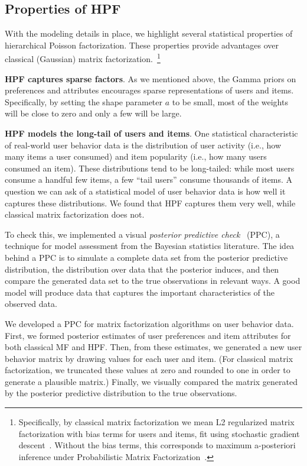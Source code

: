 \subsection{Properties of HPF}

With the modeling details in place, we highlight several statistical
properties of hierarchical Poisson factorization.  These properties
provide advantages over classical (Gaussian) matrix
factorization.~\footnote{Specifically, by classical matrix
  factorization we mean L2 regularized matrix factorization with
  bias terms for users and items, fit using stochastic gradient
  descent~\cite{Koren:2009}. Without the bias terms, this corresponds
  to maximum a-posteriori inference under Probabilistic Matrix
  Factorization~\cite{Salakhutdinov:2008a}.}

{\bf HPF captures sparse factors}.  As we mentioned above, the Gamma
priors on preferences and attributes encourages sparse representations
of users and items.  Specifically, by setting the shape parameter $a$
to be small, most of the weights will be close to zero and only a few
will be large.


{\bf HPF models the long-tail of users and items}.  One statistical
characteristic of real-world user behavior data is the distribution of
user activity (i.e., how many items a user consumed) and item
popularity (i.e., how many users consumed an item).  These
distributions tend to be long-tailed: while most users consume a
handful few items, a few ``tail users'' consume thousands of items.  A
question we can ask of a statistical model of user behavior data is
how well it captures these distributions.  We found that HPF captures
them very well, while classical matrix factorization does not.

To check this, we implemented a visual \textit{posterior predictive
  check}~\cite{Rubin:1984,Gelman:1996} (PPC), a technique for model
assessment from the Bayesian statistics literature.  The idea behind a
PPC is to simulate a complete data set from the posterior predictive
distribution, the distribution over data that the posterior induces,
and then compare the generated data set to the true observations in
relevant ways.  A good model will produce data that captures the
important characteristics of the observed data.

We developed a PPC for matrix factorization algorithms on user
behavior data.  First, we formed posterior estimates of user
preferences and item attributes for both classical MF and HPF.  Then,
from these estimates, we generated a new user behavior matrix by
drawing values for each user and item.  (For classical matrix
factorization, we truncated these values at zero and rounded to one in
order to generate a plausible matrix.)  Finally, we visually compared
the matrix generated by the posterior predictive distribution to the
true observations.

